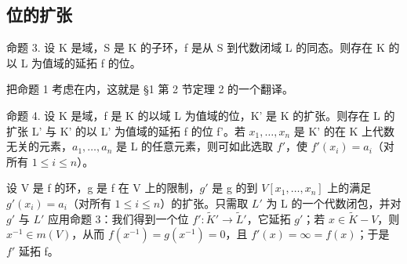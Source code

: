 \subsection{位的扩张}

命题 3. 设 K 是域，S 是 K 的子环，f 是从 S 到代数闭域 L 的同态。则存在 K 的以 L 为值域的延拓 f 的位。

把命题 1 考虑在内，这就是 §1 第 2 节定理 2 的一个翻译。

命题 4. 设 K 是域，f 是 K 的以域 L 为值域的位，K' 是 K 的扩张。则存在 L 的扩张 L' 与 K' 的以 L' 为值域的延拓 f 的位 f'。若 \(x_{1}, \ldots, x_{n}\) 是 K' 的在 K 上代数无关的元素，\(a_1, \ldots, a_n\) 是 L 的任意元素，则可如此选取 \(f'\)，使 \(f'(x_i) = a_i\)（对所有 \(1 \leqslant i \leqslant n\)）。

设 V 是 f 的环，g 是 f 在 V 上的限制，\(g'\) 是 g 的到 \(V[x_{1},\ldots,x_{n}]\) 上的满足 \(g'(x_{i}) = a_{i}\)（对所有 \(1 \leqslant i \leqslant n\)）的扩张。只需取 \(L'\) 为 L 的一个代数闭包，并对 \(g'\) 与 \(L'\) 应用命题 3：我们得到一个位 \(f'\colon \tilde{K}' \to \tilde{L}'\)，它延拓 \(g'\)；若 \(x \in \tilde{K} - V\)，则 \(x^{-1} \in m(V)\)，从而 \(f(x^{-1}) = g(x^{-1}) = 0\)，且 \(f'(x) = \infty = f(x)\)；于是 \(f'\) 延拓 f。

